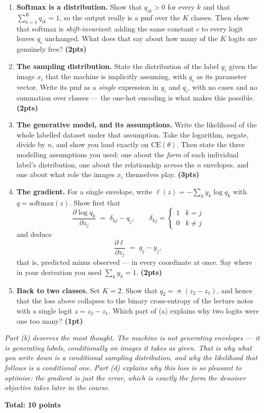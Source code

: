 \documentclass[11pt,a4paper]{article}
\newcommand{\pts}[1]{\hfill\textbf{(#1pts)}}
\newcommand{\pt}[1]{\hfill\textbf{(#1pt)}}
\newcommand{\total}[1]{\par\medskip\noindent\textbf{Total: #1 points}}
\newcommand{\sig}{\operatorname{\sigma}}
\newenvironment{parts}
  {\begin{enumerate}\setlength{\itemsep}{0.45em}\setlength{\parskip}{0pt}}
  {\end{enumerate}}
\begin{document}
\begin{parts}
  \item \textbf{Softmax is a distribution.} Show that $q_{ik} > 0$ for every $k$
        and that $\sum_{k=1}^{K} q_{ik} = 1$, so the output really is a pmf over
        the $K$ classes. Then show that softmax is \emph{shift-invariant}: adding
        the same constant $c$ to every logit leaves $q_i$ unchanged. What does
        that say about how many of the $K$ logits are genuinely free? \pts{2}
  \item \textbf{The sampling distribution.} State the distribution of the label
        $y_i$ given the image $x_i$ that the machine is implicitly assuming, with
        $q_i$ as its parameter vector. Write its pmf as a \emph{single}
        expression in $y_i$ and $q_i$, with no cases and no summation over
        classes --- the one-hot encoding is what makes this possible. \pts{2}
  \item \textbf{The generative model, and its assumptions.} Write the likelihood
        of the whole labelled dataset under that assumption. Take the logarithm,
        negate, divide by $n$, and show you land exactly on $\mathrm{CE}(\theta)$.
        Then state the three modelling assumptions you used: one about the
        \emph{form} of each individual label's distribution, one about the
        relationship \emph{across} the $n$ envelopes, and one about what role the
        images $x_i$ themselves play. \pts{3}
  \item \textbf{The gradient.} For a single envelope, write $\ell(z) = -\sum_k
        y_k \log q_k$ with $q = \mathrm{softmax}(z)$. Show first that
        \[
          \frac{\partial \log q_k}{\partial z_j} \;=\; \delta_{kj} - q_j,
          \qquad
          \delta_{kj} = \begin{cases} 1 & k = j\\ 0 & k \ne j\end{cases}
        \]
        and deduce
        \[
          \frac{\partial \ell}{\partial z_j} \;=\; q_j - y_j ,
        \]
        that is, predicted minus observed --- in every coordinate at once. Say
        where in your derivation you used $\sum_k y_k = 1$. \pts{2}
  \item \textbf{Back to two classes.} Set $K = 2$. Show that
        $q_2 = \sig(z_2 - z_1)$, and hence that the loss above collapses to the
        binary cross-entropy of the lecture notes with a single logit
        $z = z_2 - z_1$. Which part of (a) explains why two logits were one too
        many? \pt{1}
\end{parts}

\noindent\textit{Part (b) deserves the most thought. The machine is not
generating envelopes --- it is generating \emph{labels}, conditionally on images
it takes as given. That is why what you write down is a conditional sampling
distribution, and why the likelihood that follows is a conditional one. Part (d)
explains why this loss is so pleasant to optimise: the gradient is just the
error, which is exactly the form the denoiser objective takes later in the
course.}

\total{10}
\end{document}
